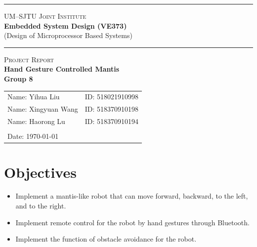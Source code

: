 \documentclass[a4paper]{article}
\begin{document}
\begin{titlepage}
    \vspace*{0.25cm}
    \noindent\rule[0.25\baselineskip]{\textwidth}{1pt}
    \begin{center}
        \huge{\textsc{UM--SJTU Joint Institute}}\vspace{0.3em}\\
        \huge{\textbf{Embedded System Design (VE373)}}\vspace{0.3em}\\
        \Large{(Design of Microprocessor Based Systems)}
        \noindent\rule[0.25\baselineskip]{\textwidth}{1pt}
    \end{center}
    \begin{center}
        \vspace{5cm}
        \Large{\textsc{Project Report}}\vspace{0.5em}\\
        \Large{\textbf{Hand Gesture Controlled Mantis}}\vspace{1em}\\
        \Large{\textbf{Group 8}}\\
    \end{center}
    \vfill
    \large
    \begin{tabular}{ll}
        Name: Yihua Liu \hspace*{2em}&ID: 518021910998\hspace*{2em}\\
        Name: Xingyuan Wang \hspace*{2em}&ID: 518370910198\hspace*{2em}\\
        Name: Haorong Lu \hspace*{2em}&ID: 518370910194\hspace*{2em}\\
        \\
        Date: \today
    \end{tabular}
\end{titlepage}
\tableofcontents
\newpage
\section{Objectives}
\begin{itemize}
    \item Implement a mantis-like robot that can move forward, backward, to the left, and to the right.
    \item Implement remote control for the robot by hand gestures through Bluetooth.
    \item Implement the function of obstacle avoidance for the robot.
\end{itemize}
\end{document}
